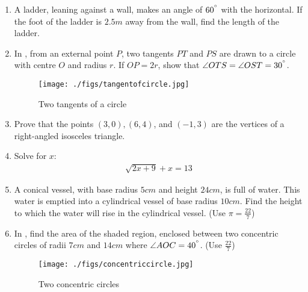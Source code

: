\documentclass{article}
\begin{document}
\begin{enumerate}                                                                                    
	\item A ladder, leaning against a wall, makes an angle of $60^{\degree}$ with the horizontal. If the foot of the ladder is $2.5m$ away from the wall, find the length of the ladder.  

\item In , from an external point $P$, two tangents $PT$ and $PS$ are drawn to a circle with centre $O$ and radius $r$. If $OP = 2r$, show that $\angle OTS = \angle OST = 30^{\degree}$.
    \begin{figure}[H]
    \texttt{[image: ./figs/tangentofcircle.jpg]}                            	
    \caption{Two tangents of a circle}      
    \label{fig:tangentofcircle}              
    \end{figure}                                                                                             

\item Prove that the points $(3, 0), (6, 4)$, and $(-1, 3)$ are the vertices of a right-angled isosceles triangle.                                                                                             
                                                                              

\item Solve for $x$:
    \begin{align}
        \sqrt{2x+9} + x = 13
    \end{align}                                                                                             
                                                                                         

\item A conical vessel, with base radius $5cm$ and height $24cm$, is full of water. This water is emptied into a cylindrical vessel of base radius $10cm$. Find the height to which the water will rise in the cylindrical vessel. (Use $\pi = \frac{22}{7}$)                                                                                                                                                                                          

\item In , find the area of the shaded region, enclosed between two concentric circles of radii $7cm$ and $14 cm$ where $\angle AOC = 40^{\degree}$. (Use $\frac{22}{7}$)
    \begin{figure}[H]
        \texttt{[image: ./figs/concentriccircle.jpg]}                                       
        \caption{Two concentric circles}      
        \label{fig:concentriccircle}     
        \end{figure}                                                                                             
                                                  


\end{enumerate}
\end{document}
